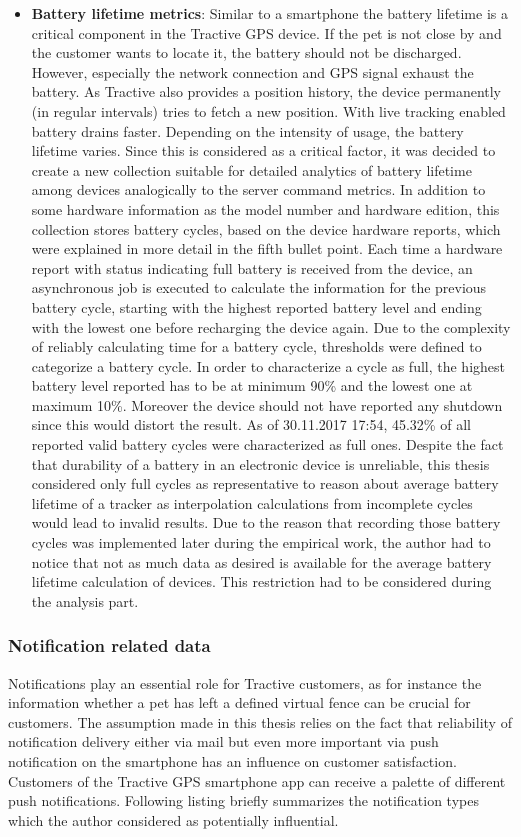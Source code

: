 \begin{itemize}
	\item \textbf{Battery lifetime metrics}: Similar to a smartphone the battery lifetime is a critical component in the Tractive GPS device. If the pet is not close by and the customer wants to locate it, the battery should not be discharged. However, especially the network connection and GPS signal exhaust the battery. As Tractive also provides a position history, the device permanently (in regular intervals) tries to fetch a new position. With live tracking enabled battery drains faster. Depending on the intensity of usage, the battery lifetime varies. Since this is considered as a critical factor, it was decided to create a new collection suitable for detailed analytics of battery lifetime among devices analogically to the server command metrics. In addition to some hardware information as the model number and hardware edition, this collection stores battery cycles, based on the device hardware reports, which were explained in more detail in the fifth bullet point. Each time a hardware report with status indicating full battery is received from the device, an asynchronous job is executed to calculate the information for the previous battery cycle, starting with the highest reported battery level and ending with the lowest one before recharging the device again. Due to the complexity of reliably calculating time for a battery cycle, thresholds were defined to categorize a battery cycle. In order to characterize a cycle as full, the highest battery level reported has to be at minimum 90\% and the lowest one at maximum 10\%. Moreover the device should not have reported any shutdown since this would distort the result. As of 30.11.2017 17:54, 45.32\% of all reported valid battery cycles were characterized as full ones. Despite the fact that durability of a battery in an electronic device is unreliable, this thesis considered only full cycles as representative to reason about average battery lifetime of a tracker as interpolation calculations from incomplete cycles would lead to invalid results. Due to the reason that recording those battery cycles was implemented later during the empirical work, the author had to notice that not as much data as desired is available for the average battery lifetime calculation of devices. This restriction had to be considered during the analysis part. 
\end{itemize}

\subsubsection{Notification related data} 
Notifications play an essential role for Tractive customers, as for instance the information whether a pet has left a defined virtual fence can be crucial for customers. The assumption made in this thesis relies on the fact that reliability of notification delivery either via mail but even more important via push notification on the smartphone has an influence on customer satisfaction. Customers of the Tractive GPS smartphone app can receive a palette of different push notifications. Following listing briefly summarizes the notification types which the author considered as potentially influential.

